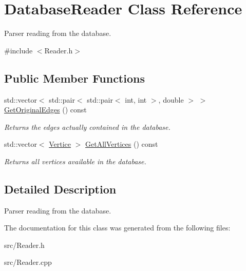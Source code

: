 \hypertarget{classDatabaseReader}{}\section{Database\+Reader Class Reference}
\label{classDatabaseReader}


Parser reading from the database.  




{\ttfamily \#include $<$Reader.\+h$>$}

\subsection*{Public Member Functions}
\begin{DoxyCompactItemize}
\item 
\mbox{\label{classDatabaseReader_a9ee9e91c37968047fb248d2fb61febe7}} 
std\+::vector$<$ std\+::pair$<$ std\+::pair$<$ int, int $>$, double $>$ $>$ \hyperlink{classDatabaseReader_a9ee9e91c37968047fb248d2fb61febe7}{Get\+Original\+Edges} () const
\begin{DoxyCompactList}\small\item\em Returns the edges actually contained in the database. \end{DoxyCompactList}\item 
\mbox{\label{classDatabaseReader_a516e845e06de32f8060323094ff11c22}} 
std\+::vector$<$ \hyperlink{classVertice}{Vertice} $>$ \hyperlink{classDatabaseReader_a516e845e06de32f8060323094ff11c22}{Get\+All\+Vertices} () const
\begin{DoxyCompactList}\small\item\em Returns all vertices available in the database. \end{DoxyCompactList}\end{DoxyCompactItemize}


\subsection{Detailed Description}
Parser reading from the database. 

The documentation for this class was generated from the following files\+:\begin{DoxyCompactItemize}
\item 
src/Reader.\+h\item 
src/Reader.\+cpp\end{DoxyCompactItemize}
